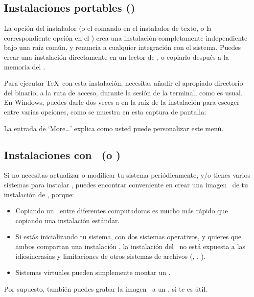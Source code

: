 \documentclass{article}
\begin{document}
\subsection{Instalaciones portables (\USB{})}
\label{sec:portable-tl}

La opción  del instalador (o el comando
 en el instalador de texto, o la correspondiente
opción en el \GUI{}) crea una instalación completamente
independiente bajo una raíz común, y renuncia a cualquier
integración con el sistema. Puedes crear una instalación
directamente en un lector de \USB{}, o copiarlo después a la
memoria del \USB{}.

Para ejecutar \TeX\ con esta instalación, necesitas añadir el
apropiado directorio del binario, a la ruta de acceso, durante la sesión
de la terminal, como es usual. En Windows, puedes darle dos veces a 
 en la raíz de la instalación para escoger
entre varias opciones, como se muestra en esta captura de pantalla:

\medskip
{}
\smallskip

\noindent La entrada de `More\ldots' explica como usted puede
personalizar este menú. 

\subsection{Instalaciones con \ISO\ (o \DVD) }
\label{sec:isoinstall}

Si no necesitas actualizar o modificar tu sistema periódicamente,
y\slash o tienes varios sistemas para instalar \TL{}, puedes
encontrar conveniente en crear una imagen \ISO\ de tu instalación de
\TL{}, porque:

\begin{itemize}
	\item Copiando un \ISO\ entre diferentes computadoras es mucho más
		rápido que copiando una instalación estándar. 
	\item Si estás inicializando tu sistema, con dos sistemas
		operativos, y quieres que ambos compartan una
		instalación \TL{}, la instalación del \ISO\ no está
		expuesta a las idiosincrasias y limitaciones de
		otros sistemas de archivos (, ,
		).
	\item Sistemas virtuales pueden simplemente montar un \ISO.
\end{itemize}

Por supuesto, también puedes grabar la imagen \ISO\ a un \DVD, si te
es útil. 
\end{document}
